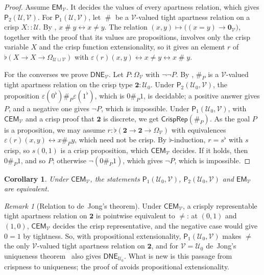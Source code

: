 \documentclass[11pt]{amsart}
\newtheorem{corollary}[theorem]{Corollary}
\theoremstyle{definition}
\theoremstyle{remark}
\newtheorem{remark}[theorem]{Remark}
\newcommand{\U}{\mathcal U}
\newcommand{\V}{\mathcal V}
\newcommand{\Uz}{\mathcal U_0}
\newcommand{\B}{\mathbf 2}
\newcommand{\Om}{\Omega}
\newcommand{\crisp}{\mathrel{::}}
\newcommand{\cu}{\varepsilon}
\newcommand{\fl}[1]{{#1}^{\flat}}
\newcommand{\EM}{\mathsf{EM}}
\newcommand{\DNE}{\mathsf{DNE}}
\newcommand{\CEM}{\mathsf{CEM}}
\newcommand{\CrispRep}{\mathsf{CrispRep}}
\newcommand{\Pone}{\mathsf P_1}
\newcommand{\Ptwo}{\mathsf P_2}
\newcommand{\ap}{\mathrel{\#}}
\newcommand{\apP}[1]{\mathrel{\#_{#1}}}
\begin{document}
\begin{proof}
Assume $\EM_\V$. It decides the values of every apartness relation, which
gives $\Ptwo(\U,\V)$. For $\Pone(\U,\V)$, let $\ap$ be a $\V$-valued tight
apartness relation on a crisp $X\crisp\U$. By ,
$x\ap y\leftrightarrow x\neq y$. The relation
$(x,y)\mapsto\bigl((x=y)\to\mathbf 0_\V\bigr)$, together with the proof
that its values are propositions, involves only the crisp variable $X$
and the crisp function extensionality, so it gives an element $r$ of
$\flat(X\to X\to\Om_{\U\sqcup\V})$ with $\cu(r)(x,y)\leftrightarrow
x\neq y\leftrightarrow x\ap y$.

For the converses we prove $\DNE_\V$. Let $P:\Om_\V$ with $\neg\neg P$. By
, $\apP{P}$ is a $\V$-valued tight apartness relation on
the crisp type $\B:\Uz$. Under $\Ptwo(\Uz,\V)$, the proposition
$\cu(\fl 0)\apP{P}\cu(\fl 1)$, which is $0\apP{P}1$, is decidable; a
positive answer gives $P$, and a negative one gives $\neg P$, which is
impossible. Under $\Pone(\Uz,\V)$, with $\CEM_\V$ and a crisp proof that
$\B$ is discrete, we get $\CrispRep(\apP{P})$. As the goal $P$ is a
proposition, we may assume $r:\flat(\B\to\B\to\Om_\V)$ with equivalences
$\cu(r)(x,y)\leftrightarrow x\apP{P}y$, which need not be crisp. By
$\flat$-induction, $r=\fl s$ with $s$ crisp, so $s(0,1)$ is a crisp
proposition, which $\CEM_\V$ decides. If it holds, then $0\apP{P}1$, and
so $P$; otherwise $\neg(0\apP{P}1)$, which gives $\neg P$, which is
impossible.
\end{proof}

\begin{corollary}\label{cor:em}
Under $\CEM_\V$, the statements $\Pone(\Uz,\V)$, $\Ptwo(\Uz,\V)$ and
$\EM_\V$ are equivalent.
\end{corollary}

\begin{remark}[Relation to de~Jong's theorem]\label{rem:uniqueness}
Under $\CEM_\V$, a crisply representable tight apartness relation on $\B$
is pointwise equivalent to $\neq$: at $(0,1)$ and $(1,0)$, $\CEM_\V$
decides the crisp representative, and the negative case would give $0=1$
by tightness. So, with propositional extensionality, $\Pone(\Uz,\V)$
makes $\neq$ the only $\V$-valued tight apartness relation on $\B$, and
for $\V=\Uz$ de~Jong's uniqueness theorem~\cite{TypeTopology} also gives
$\DNE_{\Uz}$. What is new is this passage from crispness to uniqueness;
the proof of  avoids propositional extensionality.
\end{remark}
\end{document}
